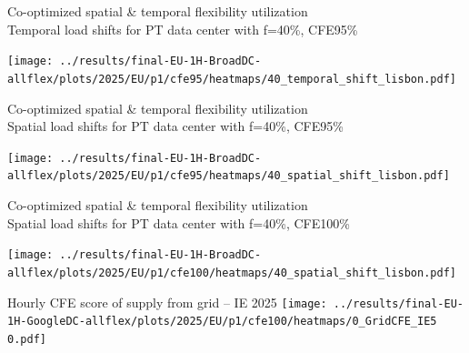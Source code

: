 \begin{frame}{Co-optimized spatial \& temporal flexibility utilization \\
  Temporal load shifts for PT data center with f=40\%, CFE95\%}

  \vspace{.3cm}
  
  \centering
  \texttt{[image: ../results/final-EU-1H-BroadDC-allflex/plots/2025/EU/p1/cfe95/heatmaps/40\_temporal\_shift\_lisbon.pdf]}

  \vspace{.3cm}

\end{frame}


\begin{frame}{Co-optimized spatial \& temporal flexibility utilization \\
  Spatial load shifts for PT data center with f=40\%, CFE95\%}

  \vspace{.3cm}
  
  \centering
  \texttt{[image: ../results/final-EU-1H-BroadDC-allflex/plots/2025/EU/p1/cfe95/heatmaps/40\_spatial\_shift\_lisbon.pdf]}

  \vspace{.3cm}

\end{frame}


\begin{frame}{Co-optimized spatial \& temporal flexibility utilization \\
  Spatial load shifts for PT data center with f=40\%, CFE100\%}

  \vspace{.3cm}
  
  \centering
  \texttt{[image: ../results/final-EU-1H-BroadDC-allflex/plots/2025/EU/p1/cfe100/heatmaps/40\_spatial\_shift\_lisbon.pdf]}

  \vspace{.3cm}

\end{frame}



\begin{frame}{Hourly CFE score of supply from grid -- IE 2025}
  \vspace{.5cm}
  \texttt{[image: ../results/final-EU-1H-GoogleDC-allflex/plots/2025/EU/p1/cfe100/heatmaps/0\_GridCFE\_IE5 0.pdf]}
\end{frame}


